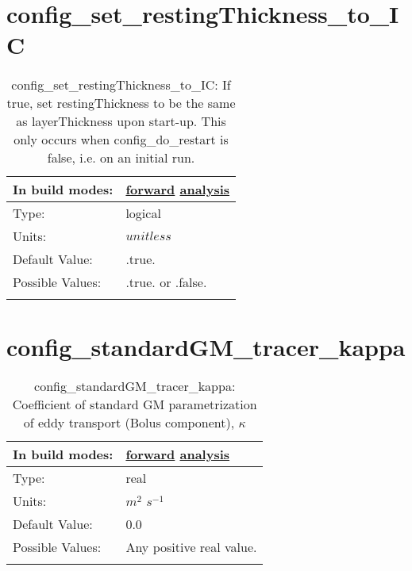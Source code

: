 \section[config\_set\_restingThickness\_to\_IC]{config\_set\_restingThickness\_to\_IC}
\label{sec:nm_sec_config_set_restingThickness_to_IC}
\begin{center}
\begin{longtable}{| p{2.0in} || p{4.0in} |}
    \hline
    In build modes: & \hyperref[subsec:forward_nm_tab_ALE_vertical_grid]{forward} \hyperref[subsec:analysis_nm_tab_ALE_vertical_grid]{analysis} \\
    \hline
    Type: & logical \\
    \hline
    Units: & $unitless$ \\
    \hline
    Default Value: & .true. \\
    \hline
    Possible Values: & .true. or .false. \\
    \hline
    \caption{config\_set\_restingThickness\_to\_IC: If true, set restingThickness to be the same as layerThickness upon start-up. This only occurs when config\_do\_restart is false, i.e. on an initial run.}
\end{longtable}
\end{center}
\section[config\_standardGM\_tracer\_kappa]{config\_standardGM\_tracer\_kappa}
\label{sec:nm_sec_config_standardGM_tracer_kappa}
\begin{center}
\begin{longtable}{| p{2.0in} || p{4.0in} |}
    \hline
    In build modes: & \hyperref[subsec:forward_nm_tab_mesoscale_eddy_parameterization]{forward} \hyperref[subsec:analysis_nm_tab_mesoscale_eddy_parameterization]{analysis} \\
    \hline
    Type: & real \\
    \hline
    Units: & $m^2$ $s^{-1}$ \\
    \hline
    Default Value: & 0.0 \\
    \hline
    Possible Values: & Any positive real value. \\
    \hline
    \caption{config\_standardGM\_tracer\_kappa:  Coefficient of standard GM parametrization of eddy transport (Bolus component),  $\kappa$ }
\end{longtable}
\end{center}
